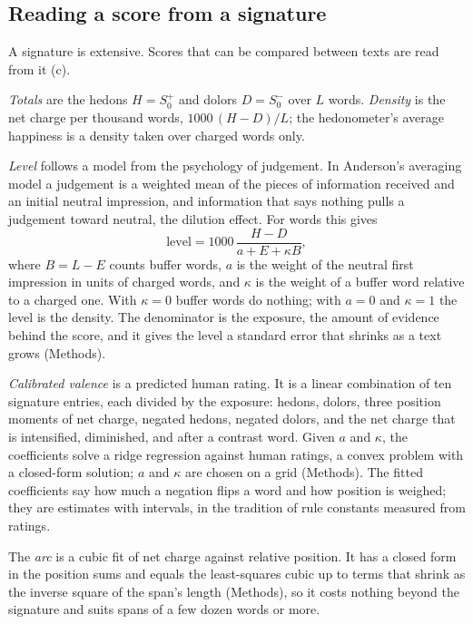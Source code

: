 \subsection{Reading a score from a signature}

A signature is extensive. Scores that can be compared between texts are read from it (c).

\emph{Totals} are the hedons $H=S^{+}_{0}$ and dolors $D=S^{-}_{0}$ over $L$ words. \emph{Density} is the net charge per thousand words, $1000\,(H-D)/L$; the hedonometer's average happiness is a density taken over charged words only.

\emph{Level} follows a model from the psychology of judgement. In Anderson's averaging model a judgement is a weighted mean of the pieces of information received and an initial neutral impression\cite{anderson1965}, and information that says nothing pulls a judgement toward neutral, the dilution effect\cite{nisbett1981}. For words this gives
\begin{equation}
\text{level}=1000\,\frac{H-D}{a+E+\kappa B},
\label{eq:level}
\end{equation}
where $B=L-E$ counts buffer words, $a$ is the weight of the neutral first impression in units of charged words, and $\kappa$ is the weight of a buffer word relative to a charged one. With $\kappa=0$ buffer words do nothing; with $a=0$ and $\kappa=1$ the level is the density. The denominator is the exposure, the amount of evidence behind the score, and it gives the level a standard error that shrinks as a text grows (Methods).

\emph{Calibrated valence} is a predicted human rating. It is a linear combination of ten signature entries, each divided by the exposure: hedons, dolors, three position moments of net charge, negated hedons, negated dolors, and the net charge that is intensified, diminished, and after a contrast word. Given $a$ and $\kappa$, the coefficients solve a ridge regression against human ratings, a convex problem with a closed-form solution; $a$ and $\kappa$ are chosen on a grid (Methods). The fitted coefficients say how much a negation flips a word and how position is weighed; they are estimates with intervals, in the tradition of rule constants measured from ratings\cite{hutto2014,kiritchenko2016}.

The \emph{arc} is a cubic fit of net charge against relative position. It has a closed form in the position sums and equals the least-squares cubic up to terms that shrink as the inverse square of the span's length (Methods), so it costs nothing beyond the signature and suits spans of a few dozen words or more.

